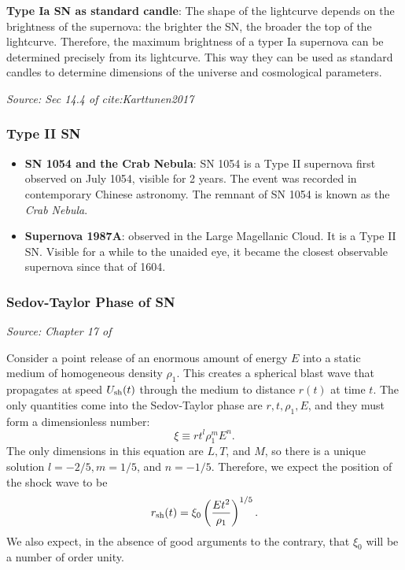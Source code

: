 \textbf{Type Ia SN as standard candle}: The shape of the lightcurve depends on the brightness of the supernova: the brighter the SN, the broader the top of the lightcurve. Therefore, the maximum brightness of a typer Ia supernova can be determined precisely from its lightcurve. This way they can be used as standard candles to determine dimensions of the universe and cosmological parameters.

\emph{Source: Sec 14.4 of cite:Karttunen2017}

\subsubsection{Type II SN}
\label{sec:orgf1aa704}

\begin{itemize}
\item \textbf{SN 1054 and the Crab Nebula}: SN 1054 is a Type II supernova first observed on July 1054, visible for 2 years. The event was recorded in contemporary Chinese astronomy. The remnant of SN 1054 is known as the \emph{Crab Nebula}.
\item \textbf{Supernova 1987A}: observed in the Large Magellanic Cloud. It is a Type II SN. Visible for a while to the unaided eye, it became the closest observable supernova since that of 1604.
\end{itemize}

\subsubsection{Sedov-Taylor Phase of SN}

\emph{Source: Chapter 17 of }

Consider a point release of an enormous amount of energy $E$ into a static medium of homogeneous density $\rho_1$. This creates a spherical blast wave that propagates at speed $U_{\rm sh}(t)$ through the medium to distance $r(t)$ at time $t$. The only quantities come into the Sedov-Taylor phase are $r, t, \rho_1, E$, and they must form a dimensionless number:
\begin{equation}
    \xi \equiv r t^l \rho_1^{m} E^n.
\end{equation}
The only dimensions in this equation are $L, T$, and $M$, so there is a unique solution $l=-2/5, m=1/5$, and $n=-1/5$. Therefore, we expect the position of the shock wave to be 
\begin{equation}\label{eq:rsh}
    r_{\rm sh}(t) = \xi_0 \left( \frac{Et^2}{\rho_1} \right)^{1/5}.
\end{equation}
We also expect, in the absence of good arguments to the contrary, that $\xi_0$ will be a number of order unity. 

